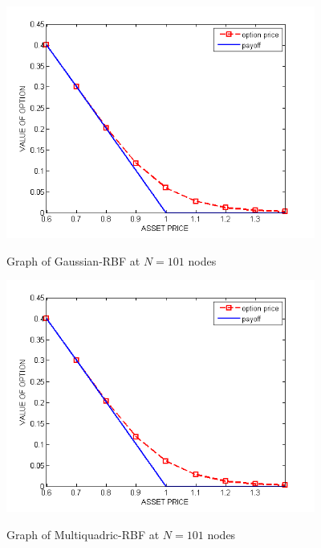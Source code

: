 \documentclass[12pt]{article}
\numberwithin{equation}{section} %
\begin{document}
\newpage
 \begin{figure}[h]
\begin{centering}
\vskip -0.5in
\includegraphics*[height=3in]{gau41.png}\
\caption{Graph of Gaussian-RBF at $N=101$ nodes }
\includegraphics*[height=3in]{mq101.png}\
\caption{Graph of Multiquadric-RBF at $N=101$ nodes }
\vskip -0.5in
\end{centering}
\end{figure}
\end{document}
